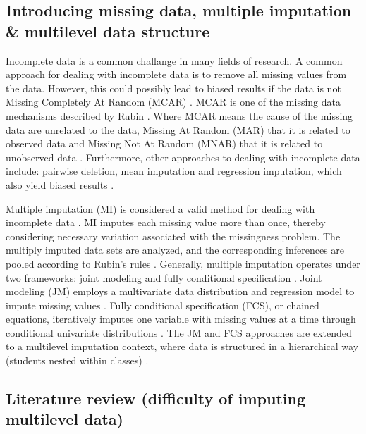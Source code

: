 \documentclass[10pt, a4paper, titlepage]{article}
\begin{document}
\subsection{Introducing missing data, multiple imputation \& multilevel data structure}
Incomplete data is a common challange in many fields of research. A common approach for dealing with incomplete data is to remove all missing values from the data. However, this could possibly lead to biased results if the data is not Missing Completely At Random (MCAR) \cite{buurenFlexibleImputationMissing2018, kang2013, enders2017, austin2021}. MCAR is one of the missing data mechanisms described by Rubin \cite{rubin1976}. Where MCAR means the cause of the missing data are unrelated to the data, Missing At Random (MAR) that it is related to observed data and Missing Not At Random (MNAR) that it is related to unobserved data \cite{buurenFlexibleImputationMissing2018, rubin1976}. Furthermore, other approaches to dealing with incomplete data include: pairwise deletion, mean imputation and regression imputation, which also yield biased results \cite{buurenFlexibleImputationMissing2018}.

Multiple imputation (MI) is considered a valid method for dealing with incomplete data \cite{mistlerComparisonJointModel2017, buurenFlexibleImputationMissing2018, enders2017, burgette2010, austin2021, audigier2018, vanbuuren2007, grund2021}. MI imputes each missing value more than once, thereby considering necessary variation associated with the missingness problem. The multiply imputed data sets are analyzed, and the corresponding inferences are pooled according to Rubin's rules \cite{buurenFlexibleImputationMissing2018, austin2021, rubin1987}.
Generally, multiple imputation operates under two frameworks: joint modeling and fully conditional specification \cite{mistlerComparisonJointModel2017, buurenFlexibleImputationMissing2018}. Joint modeling (JM) employs a multivariate data distribution and regression model to impute missing values \cite{buurenFlexibleImputationMissing2018, enders2018}. Fully conditional specification (FCS), or chained equations, iteratively imputes one variable with missing values at a time through conditional univariate distributions \cite{enders2018, buurenFlexibleImputationMissing2018}. The JM and FCS approaches are extended to a multilevel imputation context, where data is structured in a hierarchical way (students nested within classes) \cite{mistlerComparisonJointModel2017}.

\subsection{Literature review (difficulty of imputing multilevel data)}
\end{document}
